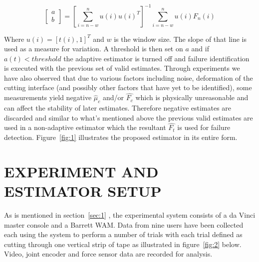 \documentclass[letterpaper, 10 pt, conference]{ieeeconf}  %
\begin{document}
\begin{equation}
\begin{bmatrix}
a \\ b
\end{bmatrix} = [\sum_{i=n-w}^{n}u(i)u(i)^T]^{-1}\sum_{i=n-w}^nu(i)F_n(i)
\end{equation}
	
\noindent Where $u(i)=[t(i),1]^T$ and $w$ is the window size. The slope of that line is used as a measure for  variation. A threshold is then set on $a$ and if $a(t) < threshold$ the adaptive estimator is turned off and failure identification is executed with the previous set of valid estimates. Through experiments we have also observed that due to various factors including noise, deformation of the cutting interface (and possibly other factors that have yet to be identified), some measurements yield negative $\hat{\mu}_c$ and/or $\hat{F_c}$ which is physically unreasonable and can affect the stability of later estimates. Therefore negative estimates are discarded and similar to what's mentioned above the previous valid estimates are used in a non-adaptive estimator which the resultant $\hat{F_t}$ is used for failure detection.  Figure~\ref{fig:1} illustrates the proposed estimator in its entire form.
 



\section{EXPERIMENT AND ESTIMATOR SETUP}
\label{sec:3}

As is mentioned in section~\ref{sec:1} , the experimental system consists of a da Vinci master console and a Barrett WAM. Data from nine users have been collected each using the system to perform a number of trials with each trial defined as cutting through one vertical strip of tape as illustrated in figure~\ref{fig:2} below. Video, joint encoder and force sensor data are recorded for analysis.
\end{document}
